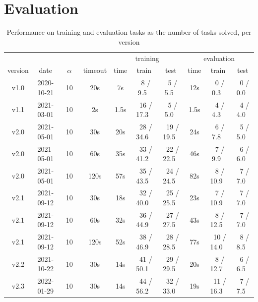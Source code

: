 \documentclass[a4paper]{llncs}
\begin{document}
\section{Evaluation}
\label{eval}


\begin{table}[t]
  \centering
  \caption{Performance on training and evaluation tasks as the number of tasks solved, per version}
  \begin{tabular}{|c|c|c|c|c|c|c|c|c|c|}
    \hline
     & & & & \multicolumn{3}{c|}{training} & \multicolumn{3}{c|}{evaluation} \\
    version & date & $\alpha$ & timeout & time & train & test & time & train & test \\
    \hline
    v1.0 & 2020-10-21 & ~10~ & 20s & 7s & ~8 / 9.5~ & ~5 / 5.5~ & 12s & ~0 / 0.3~ & ~0 / 0.0~ \\
    \hline
    v1.1 & 2021-03-01 & ~10~ & 2s & 1.5s & ~16 / 17.3~ & ~5 / 5.0~ & 1.5s & ~4 / 4.3~ & ~4 / 4.0~ \\
    \hline
    v2.0 & 2021-05-01 & ~10~ & 30s & 20s & ~28 / 34.6~ & ~19 / 19.5~ & 24s & ~6 / 7.8~  & ~5 / 5.0~ \\
    v2.0 & 2021-05-01 & ~10~ & 60s & 35s & ~33 / 41.2~ & ~22 / 22.5~ & 46s & ~7 / 9.9~ & ~6 / 6.0~ \\
    v2.0 & 2021-05-01 & ~10~ & 120s & 57s & ~35 / 43.5~ & ~24 / 24.5~ & 82s & ~8 / 10.9~ & ~7 / 7.0~ \\
    \hline
    v2.1 & 2021-09-12 & ~10~ & 30s & 18s & ~32 / 40.0~ & ~25 / 25.5~ & 23s & ~7 / 10.9~ & ~7 / 7.0~ \\
    v2.1 & 2021-09-12 & ~10~ & 60s & 32s & ~36 / 44.9~ & ~27 / 27.5~ & 43s & ~8 / 12.5~ & ~7 / 7.0~ \\
    v2.1 & 2021-09-12 & ~10~ & 120s & 52s & ~38 / 46.9~ & ~28 / 28.5~ & 77s & ~10 / 14.0~ & ~8 / 8.5~ \\
    \hline
    v2.2 & 2021-10-22 & ~10~ & 30s & 14s & ~41 / 50.1~ & ~29 / 29.5~ & 20s & ~8 / 12.7~ & ~6 / 6.5~ \\
    \hline
    v2.3 & 2022-01-29 & ~10~ & 30s & 14s & ~44 / 56.2~ & ~32 / 33.0~ & 19s & ~11 / 16.3~ & ~7 / 7.5~ \\ 
    \hline
  \end{tabular}
  \label{tab:eval}
\end{table}
\end{document}
